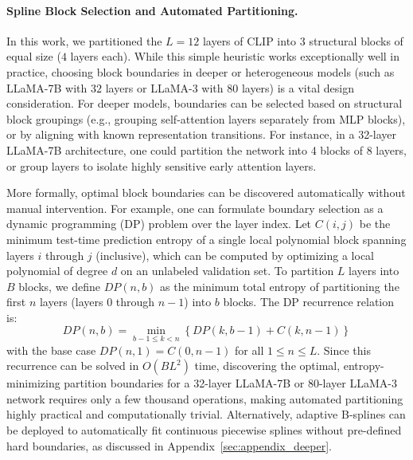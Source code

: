 \paragraph{Spline Block Selection and Automated Partitioning.} 
In this work, we partitioned the $L=12$ layers of CLIP into $3$ structural blocks of equal size ($4$ layers each). While this simple heuristic works exceptionally well in practice, choosing block boundaries in deeper or heterogeneous models (such as LLaMA-7B with $32$ layers or LLaMA-3 with $80$ layers) is a vital design consideration. For deeper models, boundaries can be selected based on structural block groupings (e.g., grouping self-attention layers separately from MLP blocks), or by aligning with known representation transitions. For instance, in a 32-layer LLaMA-7B architecture, one could partition the network into 4 blocks of 8 layers, or group layers to isolate highly sensitive early attention layers. 

More formally, optimal block boundaries can be discovered automatically without manual intervention. For example, one can formulate boundary selection as a dynamic programming (DP) problem over the layer index. Let $C(i, j)$ be the minimum test-time prediction entropy of a single local polynomial block spanning layers $i$ through $j$ (inclusive), which can be computed by optimizing a local polynomial of degree $d$ on an unlabeled validation set. To partition $L$ layers into $B$ blocks, we define $DP(n, b)$ as the minimum total entropy of partitioning the first $n$ layers (layers $0$ through $n-1$) into $b$ blocks. The DP recurrence relation is:
\begin{equation}
\label{eq:dp_recurrence}
DP(n, b) = \min_{b-1 \leq k < n} \left\{ DP(k, b-1) + C(k, n-1) \right\}
\end{equation}
with the base case $DP(n, 1) = C(0, n-1)$ for all $1 \leq n \leq L$. Since this recurrence can be solved in $O(B L^2)$ time, discovering the optimal, entropy-minimizing partition boundaries for a 32-layer LLaMA-7B or 80-layer LLaMA-3 network requires only a few thousand operations, making automated partitioning highly practical and computationally trivial. Alternatively, adaptive B-splines can be deployed to automatically fit continuous piecewise splines without pre-defined hard boundaries, as discussed in Appendix~\ref{sec:appendix_deeper}.

